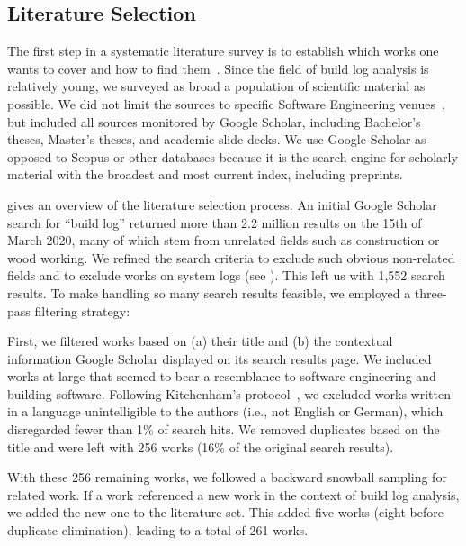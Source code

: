 \subsection{Literature Selection}
\label{sec:litsel}

The first step in a systematic literature survey is to
establish which works one wants to cover and how to find
them~\cite{kitchenham2009systematic}.
Since the field of build log analysis is relatively young, we
surveyed as broad a population of scientific material as possible.
We did not limit the sources to specific Software Engineering
venues~\cite{petersen2015guidelines}, but included all sources
monitored by Google Scholar, including Bachelor's theses, Master's
theses, and academic slide decks.
We use Google Scholar as opposed to Scopus or
other databases because it is the search engine for scholarly material
with
the broadest and most current index, including preprints.

 gives an overview of the literature selection
process.
An initial Google Scholar search for ``build log''
returned more than 2.2 million results on the 15th of March 2020, many
of which stem
from unrelated fields such as construction or wood working.
We refined the search criteria to exclude such obvious
non-related fields and to exclude works on system
logs (see ).
This left us with 1,552 search results.
To make handling so many search results feasible, we employed a
three-pass filtering strategy:

First, we filtered works based on (a) their title and (b) the
contextual information Google Scholar displayed on its search results
page.
We included works at large that seemed to bear a resemblance to software
engineering and building software.
Following Kitchenham's protocol~\cite{kitchenham2009systematic},
we excluded
works written in a language unintelligible to the authors
(i.e., not English or German), which disregarded fewer than 1\% of search
hits.
We removed duplicates based on the title and were
left with 256 works (16\% of the original search results).

With these 256 remaining works, we followed a backward snowball
sampling for related work.
If a work referenced a new work in the context
of build log analysis, we added the new one to the literature set.
This added five works (eight before
duplicate elimination), leading to a total of 261
works.


